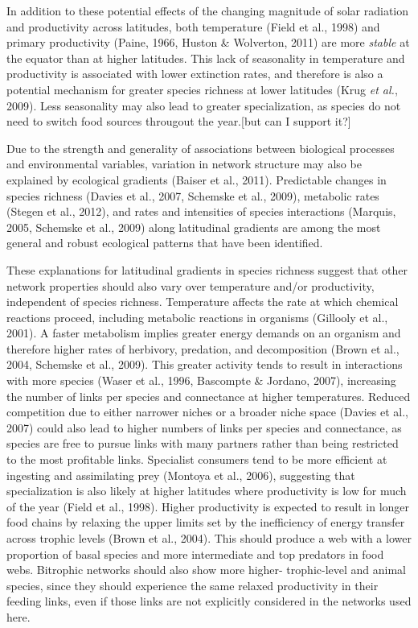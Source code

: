 In addition to these potential effects of the changing magnitude of solar
radiation and productivity across latitudes,   both temperature (Field et al.,
1998) and primary productivity (Paine, 1966, Huston & Wolverton, 2011) are
more \emph{stable} at the equator than at higher latitudes. This lack of
seasonality in temperature and productivity is associated with lower
extinction rates, and therefore is also a potential mechanism for greater
species richness at lower latitudes (Krug \emph{et al.}, 2009). Less seasonality may also lead to greater specialization, as species do not need to switch food sources througout the year.[but can I support it?]



Due to the strength and generality of associations between biological
processes and environmental variables, variation in network structure may also
be explained by ecological gradients (Baiser et al., 2011). Predictable
changes in species richness (Davies et al., 2007, Schemske et al., 2009),
metabolic rates (Stegen et al., 2012), and rates and intensities of species
interactions (Marquis, 2005, Schemske et al., 2009) along latitudinal
gradients are among the most general and robust ecological patterns that have
been identified.




These explanations for latitudinal gradients in species richness  suggest that
other network properties should also vary over temperature and/or
productivity, independent of species richness. Temperature affects the rate at
which chemical reactions proceed, including metabolic reactions in organisms
(Gillooly et al., 2001). A faster metabolism implies greater energy demands on
an organism and therefore higher rates of herbivory, predation, and
decomposition (Brown et al., 2004, Schemske et al., 2009). This greater
activity tends to result in interactions with more species (Waser et al.,
1996, Bascompte & Jordano, 2007), increasing the number of links per species
and connectance at higher temperatures. Reduced competition due to either
narrower niches or a broader niche space (Davies et al., 2007) could also lead
to higher numbers of links per species and connectance, as species are free to
pursue links with many partners rather than being restricted to the most
profitable links. Specialist consumers tend to be more efficient at ingesting
and assimilating prey (Montoya et al., 2006), suggesting that specialization
is also likely at higher latitudes where productivity is low for much of the
year (Field et al., 1998). Higher productivity is expected to result in longer
food chains by relaxing the upper limits set by the inefficiency of energy
transfer across trophic levels (Brown et al., 2004). This should produce a web
with a lower proportion of basal species and more intermediate and top
predators in food webs. Bitrophic networks should also show more higher-
trophic-level and animal species, since they should experience the same
relaxed productivity in their feeding links, even if those links are not
explicitly considered in the networks used here.


